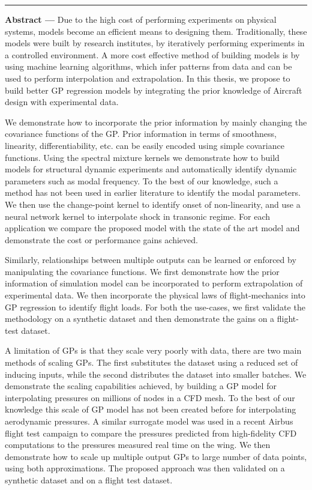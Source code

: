 \noindent\rule[2pt]{\textwidth}{0.5pt}
{\large\textbf{Abstract ---}}
Due to the high cost of performing experiments on physical systems, models become an efficient means to designing them. Traditionally, these models were built by research institutes, by iteratively performing experiments in a controlled environment. A more cost effective method of building models is by using machine learning algorithms, which infer patterns from data and can be used to perform interpolation and extrapolation. In this thesis, we propose to build better GP regression models by integrating the prior knowledge of Aircraft design with experimental data. 

We demonstrate how to incorporate the prior information by mainly changing the covariance functions of the GP. Prior information in terms of smoothness, linearity, differentiability, etc. can be easily encoded using simple covariance functions. Using the spectral mixture kernels we demonstrate how to build models for structural dynamic experiments and automatically identify dynamic parameters such as modal frequency. To the best of our knowledge, such a method has not been used in earlier literature to identify the modal parameters. We then use the change-point kernel to identify onset of non-linearity, and use a neural network kernel to interpolate shock in transonic regime. For each application we compare the proposed model with the state of the art model and demonstrate the cost or performance gains achieved. 

Similarly, relationships between multiple outputs can be learned or enforced by manipulating the covariance functions. We first demonstrate how the prior information of simulation model can be incorporated to perform extrapolation of experimental data. We then incorporate the physical laws of flight-mechanics into GP regression to identify flight loads. For both the use-cases, we first validate the methodology on a synthetic dataset and then demonstrate the gains on a flight-test dataset.

A limitation of GPs is that they scale very poorly with data, there are two main methods of scaling GPs. The first substitutes the dataset using a reduced set of inducing inputs, while the second distributes the dataset into smaller batches. We demonstrate the scaling capabilities achieved, by building a GP model for interpolating pressures on millions of nodes in a CFD mesh. To the best of our knowledge this scale of GP model has not been created before for interpolating aerodynamic pressures. A similar surrogate model was used in a recent Airbus flight test campaign to compare the pressures predicted from high-fidelity CFD computations to the pressures measured real time on the wing. We then demonstrate how to scale up multiple output GPs to large number of data points, using both approximations. The proposed approach was then validated on a synthetic dataset and on a flight test dataset.


